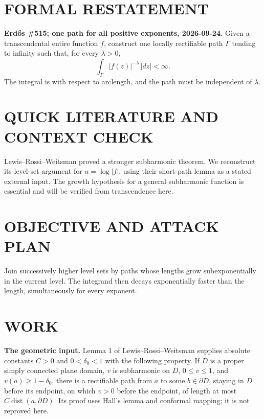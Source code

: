 \section{FORMAL RESTATEMENT}
\textbf{Erd\H{o}s \#515; one path for all positive exponents, 2026-09-24.}
Given a transcendental entire function $f$, construct one locally rectifiable path $\Gamma$ tending to infinity such that, for every $\lambda>0$,
\[
 \int_\Gamma |f(z)|^{-\lambda}\,|dz|<\infty.
\]
The integral is with respect to arclength, and the path must be independent of $\lambda$.

\section{QUICK LITERATURE AND CONTEXT CHECK}
Lewis--Rossi--Weitsman proved a stronger subharmonic theorem. We reconstruct its level-set argument for $u=\log|f|$, using their short-path lemma as a stated external input. The growth hypothesis for a general subharmonic function is essential and will be verified from transcendence here.

\section{OBJECTIVE AND ATTACK PLAN}
Join successively higher level sets by paths whose lengths grow subexponentially in the current level. The integrand then decays exponentially faster than the length, simultaneously for every exponent.

\section{WORK}
\textbf{The geometric input.} Lemma 1 of Lewis--Rossi--Weitsman supplies absolute constants $C>0$ and $0<\delta_0<1$ with the following property. If $D$ is a proper simply connected plane domain, $v$ is subharmonic on $D$, $0\leq v\leq1$, and $v(a)\geq1-\delta_0$, there is a rectifiable path from $a$ to some $b\in\partial D$, staying in $D$ before its endpoint, on which $v>0$ before the endpoint, of length at most $C\operatorname{dist}(a,\partial D)$. Its proof uses Hall's lemma and conformal mapping; it is not reproved here.

